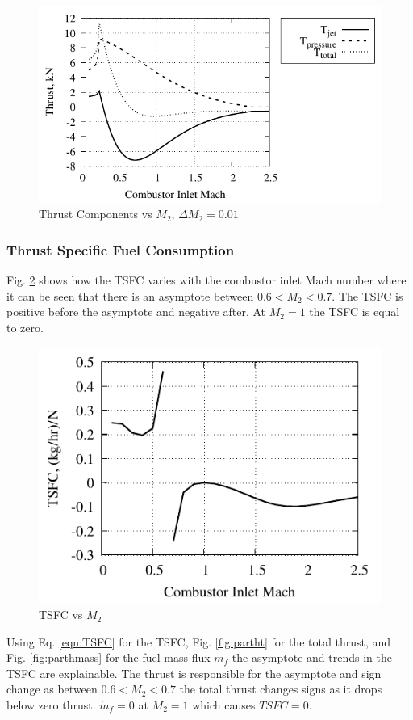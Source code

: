 \documentclass[conf]{new-aiaa} %
\begin{document}
\begin{figure}[H] %
    \centering
    \includegraphics[]{media/performance_parameter_files/part_h_all_thrust_highres.pdf}
    \caption{\label{fig:parthallthrusthighres}Thrust Components vs \texorpdfstring{\textit{$M_2$}}{M2}, \texorpdfstring{\textit{$\Delta M_2=0.01$}}{dM2=0.01}}
\end{figure}

\subsubsection{Thrust Specific Fuel Consumption}
Fig. \ref{fig:parthtsfc} shows how the TSFC varies with the combustor inlet Mach number where it can be seen that there is an asymptote between $0.6<M_2<0.7$. The TSFC is positive before the asymptote and negative after. At $M_2=1$ the TSFC is equal to zero.

\begin{figure}[H] %
    \centering
    \includegraphics[]{media/performance_parameter_files/part_h_TSFC.pdf}
    \caption{\label{fig:parthtsfc}TSFC vs \texorpdfstring{\textit{$M_2$}}{M2}}
\end{figure}
Using Eq. \ref{eqn:TSFC} for the TSFC, Fig. \ref{fig:partht} for the total thrust, and Fig. \ref{fig:parthmass} for the fuel mass flux $\dot{m}_f$ the asymptote and trends in the TSFC are explainable. The thrust is responsible for the asymptote and sign change as between $0.6<M_2<0.7$ the total thrust changes signs as it drops below zero thrust. $\dot{m}_f=0$ at $M_2=1$ which causes $TSFC=0$.
\end{document}

